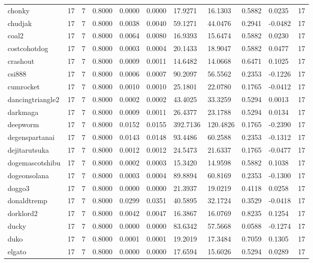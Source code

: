 \begin{table}[htbp]
\begin{tabular}{lllllllllll}
chonky & 17 & 7 & 0.8000 & 0.0000 & 0.0000 & 17.9271 & 16.1303 & 0.5882 & 0.0235 & 17 \\
chudjak & 17 & 7 & 0.8000 & 0.0038 & 0.0040 & 59.1271 & 44.0476 & 0.2941 & -0.0482 & 17 \\
coal2 & 17 & 7 & 0.8000 & 0.0064 & 0.0080 & 16.9393 & 15.6474 & 0.5882 & 0.0230 & 17 \\
costcohotdog & 17 & 7 & 0.8000 & 0.0003 & 0.0004 & 20.1433 & 18.9047 & 0.5882 & 0.0477 & 17 \\
crashout & 17 & 7 & 0.8000 & 0.0009 & 0.0011 & 14.6482 & 14.0668 & 0.6471 & 0.1025 & 17 \\
csi888 & 17 & 7 & 0.8000 & 0.0006 & 0.0007 & 90.2097 & 56.5562 & 0.2353 & -0.1226 & 17 \\
cumrocket & 17 & 7 & 0.8000 & 0.0010 & 0.0010 & 25.1801 & 22.0780 & 0.1765 & -0.0412 & 17 \\
dancingtriangle2 & 17 & 7 & 0.8000 & 0.0002 & 0.0002 & 43.4025 & 33.3259 & 0.5294 & 0.0013 & 17 \\
darkmaga & 17 & 7 & 0.8000 & 0.0009 & 0.0011 & 26.4377 & 23.1788 & 0.5294 & 0.0134 & 17 \\
deepworm & 17 & 7 & 0.8000 & 0.0152 & 0.0155 & 392.7136 & 120.4826 & 0.1765 & -0.2390 & 17 \\
degenspartanai & 17 & 7 & 0.8000 & 0.0143 & 0.0148 & 93.4486 & 60.2588 & 0.2353 & -0.1312 & 17 \\
dejitarutsuka & 17 & 7 & 0.8000 & 0.0012 & 0.0012 & 24.5473 & 21.6337 & 0.1765 & -0.0477 & 17 \\
dogemascotshibu & 17 & 7 & 0.8000 & 0.0002 & 0.0003 & 15.3420 & 14.9598 & 0.5882 & 0.1038 & 17 \\
dogeonsolana & 17 & 7 & 0.8000 & 0.0003 & 0.0004 & 89.8894 & 60.8169 & 0.2353 & -0.1300 & 17 \\
doggo3 & 17 & 7 & 0.8000 & 0.0000 & 0.0000 & 21.3937 & 19.0219 & 0.4118 & 0.0258 & 17 \\
donaldtremp & 17 & 7 & 0.8000 & 0.0299 & 0.0351 & 40.5895 & 32.1724 & 0.3529 & -0.0418 & 17 \\
dorklord2 & 17 & 7 & 0.8000 & 0.0042 & 0.0047 & 16.3867 & 16.0769 & 0.8235 & 0.1254 & 17 \\
ducky & 17 & 7 & 0.8000 & 0.0000 & 0.0000 & 83.6342 & 57.5668 & 0.0588 & -0.1274 & 17 \\
duko & 17 & 7 & 0.8000 & 0.0001 & 0.0001 & 19.2019 & 17.3484 & 0.7059 & 0.1305 & 17 \\
elgato & 17 & 7 & 0.8000 & 0.0000 & 0.0000 & 17.6594 & 15.6026 & 0.5294 & 0.0289 & 17 \\

\end{tabular}
\end{table}
